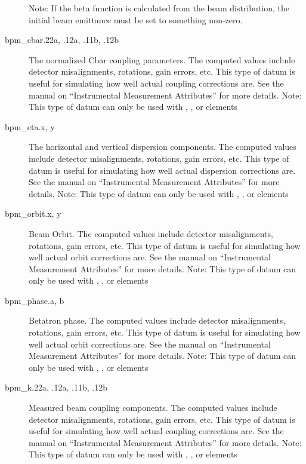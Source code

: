 \begin{description}
Note: If the beta function is calculated from the beam distribution,
the initial beam emittance must be set to something non-zero.

  \item[bpm_cbar.22a, .12a, .11b, .12b] \Newline {}
The normalized Cbar coupling parameters. The computed  values include detector
misalignments, rotations, gain errors, etc. This type of datum is useful for simulating how well
actual coupling corrections are. See the \bmad manual on ``Instrumental Measurement Attributes'' for
more details.  Note: This type of datum can only be used with , ,
 or  elements

  \item[bpm_eta.x, y] \Newline {}
The horizontal and vertical dispersion components. The computed  values include detector
misalignments, rotations, gain errors, etc. This type of datum is useful for simulating how well
actual dispersion corrections are. See the \bmad manual on ``Instrumental Measurement Attributes''
for more details.  Note: This type of datum can only be used with , ,
 or  elements

  \item[bpm_orbit.x, y] \Newline {}
Beam Orbit. The computed  values include detector misalignments, rotations, gain errors,
etc. This type of datum is useful for simulating how well actual orbit corrections are. See the
\bmad manual on ``Instrumental Measurement Attributes'' for more details.  Note: This type of datum
can only be used with , ,  or  elements

  \item[bpm_phase.a, b] \Newline {}
Betatron phase. The computed  values include detector misalignments, rotations, gain
errors, etc. This type of datum is useful for simulating how well actual orbit corrections are. See
the \bmad manual on ``Instrumental Measurement Attributes'' for more details.  Note: This type of
datum can only be used with , ,  or  elements

  \item[bpm_k.22a, .12a, .11b, .12b] \Newline {}
Measured beam coupling components. The computed  values include detector misalignments,
rotations, gain errors, etc. This type of datum is useful for simulating how well actual coupling
corrections are. See the \bmad manual on ``Instrumental Measurement Attributes'' for more details.
Note: This type of datum can only be used with , ,  or
 elements


\end{description}
